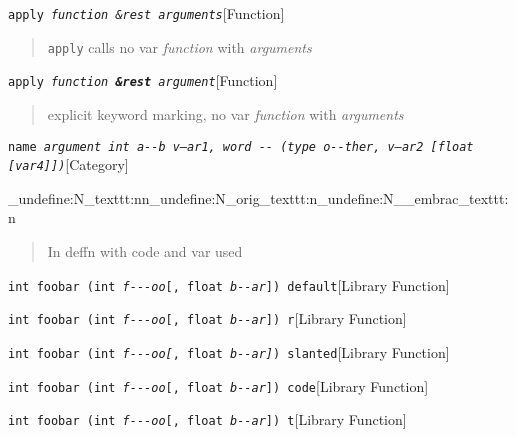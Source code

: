 \documentclass{book}
\begin{document}
\noindent\texttt{apply \EmbracOn{}\textnormal{\textsl{function \&rest arguments}}\EmbracOff{}}\hfill[Function]



%
\begin{quote}
\texttt{apply} calls no var \textsl{function} with \textsl{arguments}
\end{quote}

\noindent\texttt{apply \EmbracOn{}\textnormal{\textsl{function \EmbracOff{}\textnormal{\textbf{\&rest}}\EmbracOn{} argument}}\EmbracOff{}}\hfill[Function]



%
\begin{quote}
explicit keyword marking, no var \textsl{function} with \textsl{arguments}
\end{quote}

\noindent\texttt{name \EmbracOn{}\textnormal{\textsl{argument \texttt{int} \texttt{a{-}{-}b} \textsl{v--ar1}, word \texttt{{-}{-}} (\texttt{type o{-}{-}ther}, \textsl{v---ar2}  [\texttt{float} [\textsl{var4}{]}{]})}}\EmbracOff{}}\hfill[Category]


\ExplSyntaxOn%
\cs_undefine:N{\embrac_texttt:nn}\cs_undefine:N{\embrac_orig_texttt:n}\cs_undefine:N{\__embrac_texttt:n}%
\ExplSyntaxOff%
%
\begin{quote}
In deffn with code and var used
\end{quote}

\noindent\texttt{int foobar (int \textsl{f{-}{-}{-}oo}[, float \textsl{b{-}{-}ar}{]}) default}\hfill[Library Function]



%
\noindent\texttt{int foobar (int \textsl{f{-}{-}{-}oo}\textnormal{[}, float \textsl{b{-}{-}ar}\textnormal{{]}}) r}\hfill[Library Function]



%
\noindent\texttt{int foobar (int \textsl{f{-}{-}{-}oo}\textsl{[}, float \textsl{b{-}{-}ar}\textsl{{]}}) slanted}\hfill[Library Function]



%
\noindent\texttt{int foobar (int \textsl{f{-}{-}{-}oo}\texttt{[}, float \textsl{b{-}{-}ar}\texttt{{]}}) code}\hfill[Library Function]



%
\noindent\texttt{int foobar (int \textsl{f{-}{-}{-}oo}\texttt{[}, float \textsl{b{-}{-}ar}\texttt{{]}}) t}\hfill[Library Function]
\end{document}

